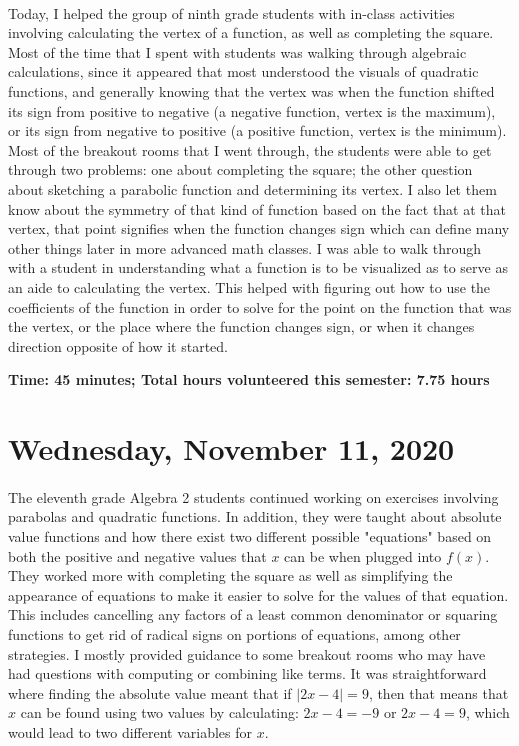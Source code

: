 \documentclass{article}
\begin{document}
\paragraph{} Today, I helped the group of ninth grade students with in-class activities involving calculating the vertex of a function, as well as completing the square. Most of the time that I spent with students was walking through algebraic calculations, since it appeared that most understood the visuals of quadratic functions, and generally knowing that the vertex was when the function shifted its sign from positive to negative (a negative function, vertex is the maximum), or its sign from negative to positive (a positive function, vertex is the minimum). Most of the breakout rooms that I went through, the students were able to get through two problems: one about completing the square; the other question about sketching a parabolic function and determining its vertex. I also let them know about the symmetry of that kind of function based on the fact that at that vertex, that point signifies when the function changes sign which can define many other things later in more advanced math classes. I was able to walk through with a student in understanding what a function is to be visualized as to serve as an aide to calculating the vertex. This helped with figuring out how to use the coefficients of the function in order to solve for the point on the function that was the vertex, or the place where the function changes sign, or when it changes direction opposite of how it started. 

\textbf{Time: 45 minutes; Total hours volunteered this semester: 7.75 hours}


\section{Wednesday, November 11, 2020}

\paragraph{}The eleventh grade Algebra 2 students continued working on exercises involving parabolas and quadratic functions. In addition, they were taught about absolute value functions and how there exist two different possible "equations" based on both the positive and negative values that $x$ can be when plugged into $f(x)$. They worked more with completing the square as well as simplifying the appearance of equations to make it easier to solve for the values of that equation. This includes cancelling any factors of a least common denominator or squaring functions to get rid of radical signs on portions of equations, among other strategies. I mostly provided guidance to some breakout rooms who may have had questions with computing or combining like terms. It was straightforward where finding the absolute value meant that if ${\left\lvert 2x - 4 \right\rvert} = 9$, then that means that $x$ can be found using two values by calculating: $2x - 4 = -9$ or $2x - 4 = 9$, which would lead to two different variables for $x$. 
\end{document}
